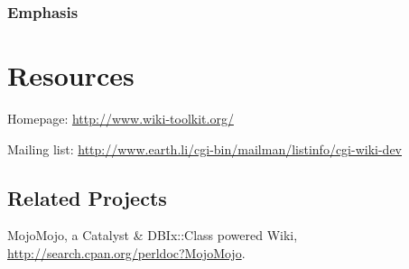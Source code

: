 \subsubsection{Emphasis}

\section{Resources}

Homepage: \url{http://www.wiki-toolkit.org/}

Mailing list: \url{http://www.earth.li/cgi-bin/mailman/listinfo/cgi-wiki-dev}

\subsection{Related Projects}
MojoMojo, a Catalyst \& DBIx::Class powered Wiki,
\url{http://search.cpan.org/perldoc?MojoMojo}.


    
